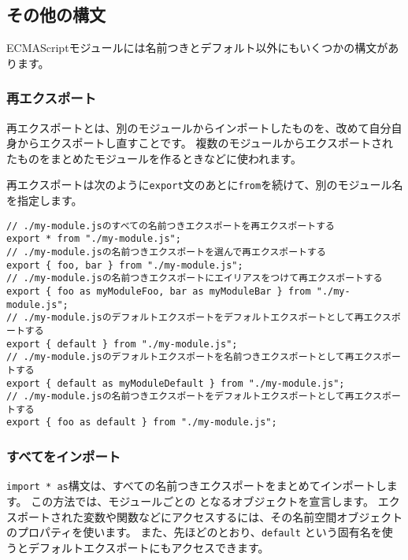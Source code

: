 \hypertarget{other-syntax}{%
\subsection{その他の構文}\label{other-syntax}}

ECMAScriptモジュールには名前つきとデフォルト以外にもいくつかの構文があります。

\hypertarget{re-export}{%
\subsubsection{再エクスポート}\label{re-export}}

再エクスポートとは、別のモジュールからインポートしたものを、改めて自分自身からエクスポートし直すことです。
複数のモジュールからエクスポートされたものをまとめたモジュールを作るときなどに使われます。

再エクスポートは次のように\texttt{export}文のあとに\texttt{from}を続けて、別のモジュール名を指定します。

\begin{lstlisting}
// ./my-module.jsのすべての名前つきエクスポートを再エクスポートする
export * from "./my-module.js";
// ./my-module.jsの名前つきエクスポートを選んで再エクスポートする
export { foo, bar } from "./my-module.js";
// ./my-module.jsの名前つきエクスポートにエイリアスをつけて再エクスポートする
export { foo as myModuleFoo, bar as myModuleBar } from "./my-module.js";
// ./my-module.jsのデフォルトエクスポートをデフォルトエクスポートとして再エクスポートする
export { default } from "./my-module.js";
// ./my-module.jsのデフォルトエクスポートを名前つきエクスポートとして再エクスポートする
export { default as myModuleDefault } from "./my-module.js";
// ./my-module.jsの名前つきエクスポートをデフォルトエクスポートとして再エクスポートする
export { foo as default } from "./my-module.js";
\end{lstlisting}

\hypertarget{namespace-import}{%
\subsubsection{すべてをインポート}\label{namespace-import}}

\texttt{import * as}構文は、すべての名前つきエクスポートをまとめてインポートします。
この方法では、モジュールごとの \textbf{}
となるオブジェクトを宣言します。
エクスポートされた変数や関数などにアクセスするには、その名前空間オブジェクトのプロパティを使います。
また、先ほどのとおり、\texttt{default}
という固有名を使うとデフォルトエクスポートにもアクセスできます。

